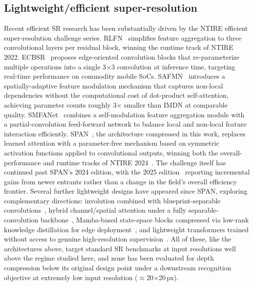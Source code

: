 \documentclass[pdflatex,sn-vancouver-num]{sn-jnl}
\begin{document}
\subsection{Lightweight/efficient super-resolution}
\label{sec:related-sr}

Recent efficient SR research has been substantially driven by the NTIRE efficient super-resolution challenge series. RLFN~\cite{kong2022rlfn} simplifies feature aggregation to three convolutional layers per residual block, winning the runtime track of NTIRE 2022. ECBSR~\cite{zhang2021ecbsr} proposes edge-oriented convolution blocks that re-parameterize multiple operations into a single 3$\times$3 convolution at inference time, targeting real-time performance on commodity mobile SoCs. SAFMN~\cite{sun2023safmn} introduces a spatially-adaptive feature modulation mechanism that captures non-local dependencies without the computational cost of dot-product self-attention, achieving parameter counts roughly 3$\times$ smaller than IMDN at comparable quality. SMFANet~\cite{zheng2024smfanet} combines a self-modulation feature aggregation module with a partial-convolution feed-forward network to balance local and non-local feature interaction efficiently. SPAN~\cite{wan2024span}, the architecture compressed in this work, replaces learned attention with a parameter-free mechanism based on symmetric activation functions applied to convolutional outputs, winning both the overall-performance and runtime tracks of NTIRE 2024~\cite{ren2024ntire}. The challenge itself has continued past SPAN's 2024 edition, with the 2025 edition~\cite{ren2025ntire} reporting incremental gains from newer entrants rather than a change in the field's overall efficiency frontier. Several further lightweight designs have appeared since SPAN, exploring complementary directions: involution combined with blueprint-separable convolutions~\cite{khatami2025ibmdn}, hybrid channel/spatial attention under a fully separable-convolution backbone~\cite{cao2024hasn}, Mamba-based state-space blocks compressed via low-rank knowledge distillation for edge deployment~\cite{aalishah2025mambalitesr}, and lightweight transformers trained without access to genuine high-resolution supervision~\cite{moller2025lronly}. All of these, like the architectures above, target standard SR benchmarks at input resolutions well above the regime studied here, and none has been evaluated for depth compression below its original design point under a downstream recognition objective at extremely low input resolution ($\approx$20$\times$20\,px).
\end{document}

